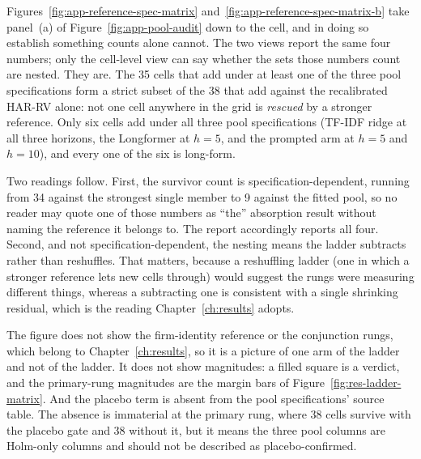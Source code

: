 Figures~\ref{fig:app-reference-spec-matrix} and~\ref{fig:app-reference-spec-matrix-b} take panel~(a) of
Figure~\ref{fig:app-pool-audit} down to the cell, and in doing so establish
something counts alone cannot. The two views report the same four numbers;
only the cell-level view can say whether the sets those numbers count are
nested. They are. The 35 cells that add under at least one of the three pool
specifications form a strict subset of the 38 that add against the
recalibrated HAR-RV alone: not one cell anywhere in the grid is
\emph{rescued} by a stronger reference. %
Only six cells add under all three pool specifications (TF-IDF ridge at all
three horizons, the Longformer at $h=5$, and the prompted arm at $h=5$ and
$h=10$), and every one of the six is long-form. %

Two readings follow. First, the survivor count is specification-dependent,
running from 34 against the strongest single member to 9 against the fitted
pool, so no reader may quote one of those numbers as ``the'' absorption result
without naming the reference it belongs to. The report accordingly reports all
four. Second, and not specification-dependent, the nesting means the ladder
subtracts rather than reshuffles. That matters, because a reshuffling ladder
(one in which a stronger reference lets new cells through) would suggest
the rungs were measuring different things, whereas a subtracting one is
consistent with a single shrinking residual, which is the reading
Chapter~\ref{ch:results} adopts.

The figure does not show the firm-identity reference or the conjunction rungs,
which belong to Chapter~\ref{ch:results}, so it is a picture of one arm of the
ladder and not of the ladder. It does not show magnitudes: a filled square is
a verdict, and the primary-rung magnitudes are the margin bars of
Figure~\ref{fig:res-ladder-matrix}. And the placebo term is absent from the
pool specifications' source table. The absence is immaterial at the primary rung,
where 38 cells survive with the placebo gate and 38 without it, but it means the
three pool columns are Holm-only columns and should not be described as
placebo-confirmed. %

